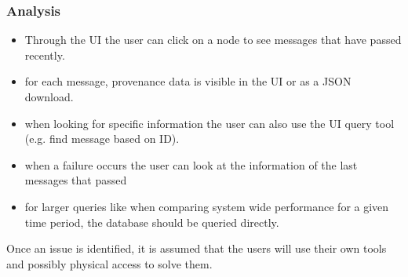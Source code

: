 \subsubsection{Analysis}
\begin{itemize}
  \item Through the UI the user can click on a node to see messages that have passed recently.
  \item for each message, provenance data is visible in the UI or as a JSON download.
  \item when looking for specific information the user can also use the UI query tool (e.g. find message based on ID).
  \item when a failure occurs the user can look at the information of the last messages that passed 
  \item for larger queries like when comparing system wide performance for a given time period, the database should be queried directly.
\end{itemize}

Once an issue is identified, it is assumed that the users will use their own tools and possibly physical access to solve them.


